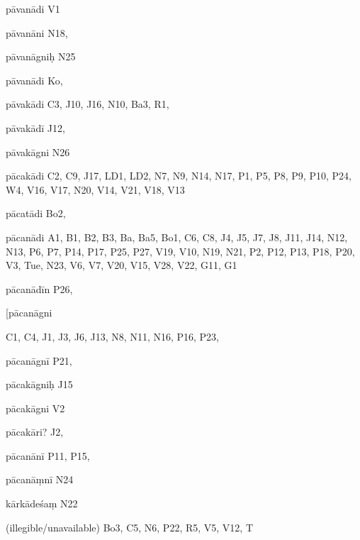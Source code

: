 \begin{marma}[hp02_009]
\begin{marma}[hp02_011]
 \begin{marma}[hp02_35a]
\item[pāvanādi] V1
\item[pāvanāni] N18,
\item[pāvanāgniḥ] N25
\item[pāvanādi] Ko,
\item[pāvakādi] C3, J10, J16, N10, Ba3, R1, 
\item[pāvakādī] J12,
\item[pāvakāgni] N26
\item[pācakādi] C2, C9, J17, LD1, LD2, N7, N9, N14, N17, P1, P5, P8, P9, P10, P24, W4, V16, V17, N20, V14, V21, V18, V13
\item[pācatādi] Bo2, 
\item[pācanādi] A1, B1, B2, B3, Ba, Ba5, Bo1, C6, C8, J4, J5, J7, J8, J11, J14, N12, N13, P6, P7, P14, P17, P25, P27, V19, V10, N19, N21, P2, P12, P13, P18, P20, V3, Tue, N23, V6, V7, V20, V15, V28, V22, G11, G1
\item[pācanādīn P26, 
\item[pācanāgni] C1, C4, J1, J3, J6, J13, N8, N11, N16, P16, P23, 
\item[pācanāgnī] P21,
\item[pācakāgniḥ] J15
\item[pācakāgni] V2
\item[pācakāri?] J2,
\item[pācanānī] P11, P15, 
\item[pācanāṃnī] N24
\item[kārkādeśaṃ] N22
\item[(illegible/unavailable)] Bo3, C5, N6, P22, R5, V5, V12, T
  \begin{description}

    \end{description}
 \end{marma}


\end{marma}
\end{marma}
